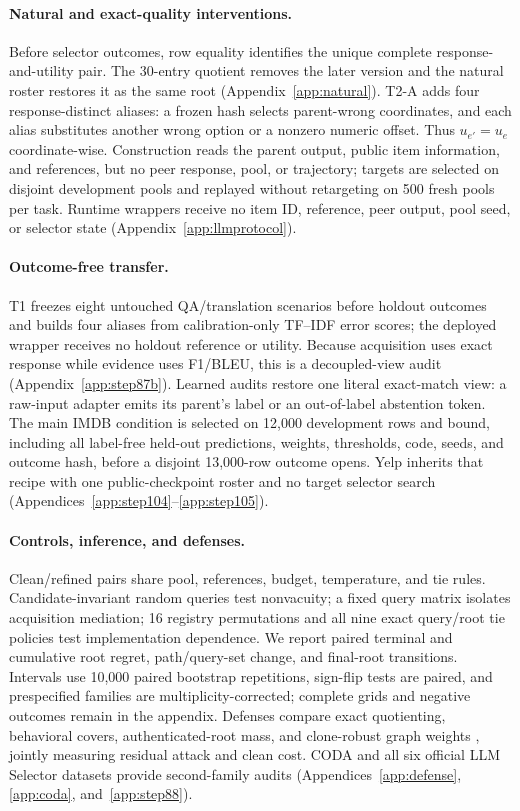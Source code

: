 \paragraph{Natural and exact-quality interventions.}
Before selector outcomes, row equality identifies the unique complete response-and-utility pair. The 30-entry quotient removes the later version and the natural roster restores it as the same root (Appendix~\ref{app:natural}). T2-A adds four response-distinct aliases: a frozen hash selects parent-wrong coordinates, and each alias substitutes another wrong option or a nonzero numeric offset. Thus $u_{e'}=u_e$ coordinate-wise. Construction reads the parent output, public item information, and references, but no peer response, pool, or trajectory; targets are selected on disjoint development pools and replayed without retargeting on 500 fresh pools per task. Runtime wrappers receive no item ID, reference, peer output, pool seed, or selector state (Appendix~\ref{app:llmprotocol}).

\paragraph{Outcome-free transfer.}
T1 freezes eight untouched QA/translation scenarios before holdout outcomes and builds four aliases from calibration-only TF--IDF error scores; the deployed wrapper receives no holdout reference or utility. Because acquisition uses exact response while evidence uses F1/BLEU, this is a decoupled-view audit (Appendix~\ref{app:step87b}). Learned audits restore one literal exact-match view: a raw-input adapter emits its parent's label or an out-of-label abstention token. The main IMDB condition is selected on 12,000 development rows and bound, including all label-free held-out predictions, weights, thresholds, code, seeds, and outcome hash, before a disjoint 13,000-row outcome opens. Yelp inherits that recipe with one public-checkpoint roster and no target selector search (Appendices~\ref{app:step104}--\ref{app:step105}).

\paragraph{Controls, inference, and defenses.}
Clean/refined pairs share pool, references, budget, temperature, and tie rules. Candidate-invariant random queries test nonvacuity; a fixed query matrix isolates acquisition mediation; 16 registry permutations and all nine exact query/root tie policies test implementation dependence. We report paired terminal and cumulative root regret, path/query-set change, and final-root transitions. Intervals use 10,000 paired bootstrap repetitions, sign-flip tests are paired, and prespecified families are multiplicity-corrected; complete grids and negative outcomes remain in the appendix. Defenses compare exact quotienting, behavioral covers, authenticated-root mass, and clone-robust graph weights \citep{berriaud2026consensus}, jointly measuring residual attack and clean cost. CODA and all six official LLM Selector datasets provide second-family audits (Appendices~\ref{app:defense}, \ref{app:coda}, and~\ref{app:step88}).
